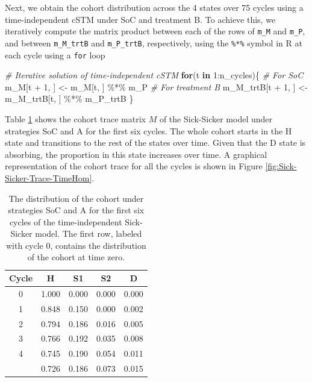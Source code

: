 \documentclass[
]{article}
\newenvironment{Shaded}{\begin{snugshade}}{\end{snugshade}}
\newcommand{\CommentTok}[1]{\textcolor[rgb]{0.56,0.35,0.01}{\textit{#1}}}
\newcommand{\ControlFlowTok}[1]{\textcolor[rgb]{0.13,0.29,0.53}{\textbf{#1}}}
\newcommand{\DecValTok}[1]{\textcolor[rgb]{0.00,0.00,0.81}{#1}}
\newcommand{\NormalTok}[1]{#1}
\newcommand{\OtherTok}[1]{\textcolor[rgb]{0.56,0.35,0.01}{#1}}
\newcommand{\SpecialCharTok}[1]{\textcolor[rgb]{0.00,0.00,0.00}{#1}}
\begin{document}
Next, we obtain the cohort distribution across the 4 states over 75 cycles using a time-independent cSTM under SoC and treatment B. To achieve this, we iteratively compute the matrix product between each of the rows of \texttt{m\_M} and \texttt{m\_P}, and between \texttt{m\_M\_trtB} and \texttt{m\_P\_trtB}, respectively, using the \texttt{\%*\%} symbol in R at each cycle using a \texttt{for} loop

\begin{Shaded}
\begin{Highlighting}[]
\CommentTok{\# Iterative solution of time{-}independent cSTM}
\ControlFlowTok{for}\NormalTok{(t }\ControlFlowTok{in} \DecValTok{1}\SpecialCharTok{:}\NormalTok{n\_cycles)\{}
  \CommentTok{\# For SoC}
\NormalTok{  m\_M[t }\SpecialCharTok{+} \DecValTok{1}\NormalTok{, ] }\OtherTok{\textless{}{-}}\NormalTok{ m\_M[t, ] }\SpecialCharTok{\%*\%}\NormalTok{ m\_P}
  \CommentTok{\# For treatment B}
\NormalTok{  m\_M\_trtB[t }\SpecialCharTok{+} \DecValTok{1}\NormalTok{, ] }\OtherTok{\textless{}{-}}\NormalTok{ m\_M\_trtB[t, ] }\SpecialCharTok{\%*\%}\NormalTok{ m\_P\_trtB}
\NormalTok{\}}
\end{Highlighting}
\end{Shaded}

Table \ref{tab:Trace} shows the cohort trace matrix \(M\) of the Sick-Sicker model under strategies SoC and A for the first six cycles. The whole cohort starts in the H state and transitions to the rest of the states over time. Given that the D state is absorbing, the proportion in this state increases over time. A graphical representation of the cohort trace for all the cycles is shown in Figure \ref{fig:Sick-Sicker-Trace-TimeHom}.

\begin{table}[!h]

\caption{\label{tab:Trace}The distribution of the cohort under strategies SoC and A for the first six cycles of the time-independent Sick-Sicker model. The first row, labeled with cycle 0, contains the distribution of the cohort at time zero.}
\centering
\begin{tabular}[t]{ccccc}
\toprule
Cycle & H & S1 & S2 & D\\
\midrule
0 & 1.000 & 0.000 & 0.000 & 0.000\\
1 & 0.848 & 0.150 & 0.000 & 0.002\\
2 & 0.794 & 0.186 & 0.016 & 0.005\\
3 & 0.766 & 0.192 & 0.035 & 0.008\\
4 & 0.745 & 0.190 & 0.054 & 0.011\\
\addlinespace
5 & 0.726 & 0.186 & 0.073 & 0.015\\
\bottomrule
\end{tabular}
\end{table}
\end{document}
